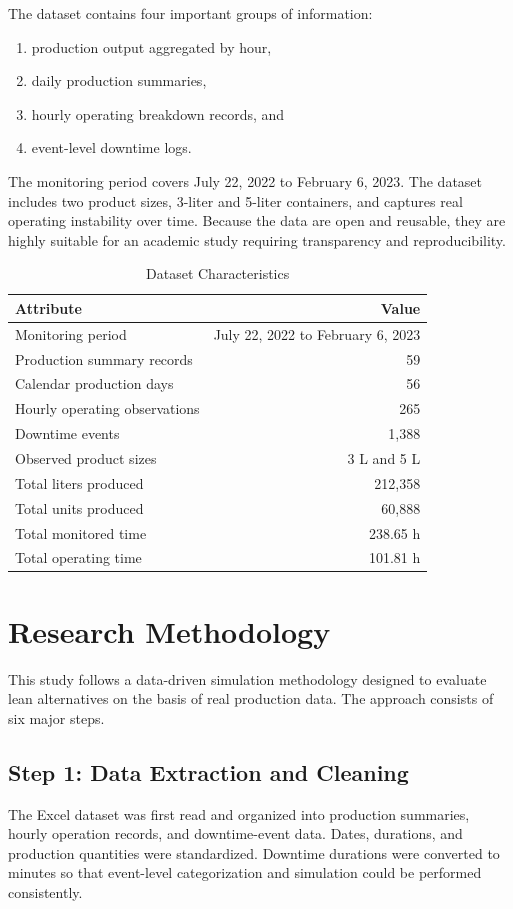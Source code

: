 \documentclass[12pt,a4paper]{article}
\begin{document}
The dataset contains four important groups of information:
\begin{enumerate}
    \item production output aggregated by hour,
    \item daily production summaries,
    \item hourly operating breakdown records, and
    \item event-level downtime logs.
\end{enumerate}

The monitoring period covers July 22, 2022 to February 6, 2023. The dataset includes two product sizes, 3-liter and 5-liter containers, and captures real operating instability over time. Because the data are open and reusable, they are highly suitable for an academic study requiring transparency and reproducibility.

\begin{table}[H]
\centering
\caption{Dataset Characteristics}
\begin{tabular}{lr}
\toprule
\textbf{Attribute} & \textbf{Value} \\
\midrule
Monitoring period & July 22, 2022 to February 6, 2023 \\
Production summary records & 59 \\
Calendar production days & 56 \\
Hourly operating observations & 265 \\
Downtime events & 1,388 \\
Observed product sizes & 3 L and 5 L \\
Total liters produced & 212,358 \\
Total units produced & 60,888 \\
Total monitored time & 238.65 h \\
Total operating time & 101.81 h \\
\bottomrule
\end{tabular}
\end{table}

\section{Research Methodology}
This study follows a data-driven simulation methodology designed to evaluate lean alternatives on the basis of real production data. The approach consists of six major steps.

\subsection{Step 1: Data Extraction and Cleaning}
The Excel dataset was first read and organized into production summaries, hourly operation records, and downtime-event data. Dates, durations, and production quantities were standardized. Downtime durations were converted to minutes so that event-level categorization and simulation could be performed consistently.
\end{document}
